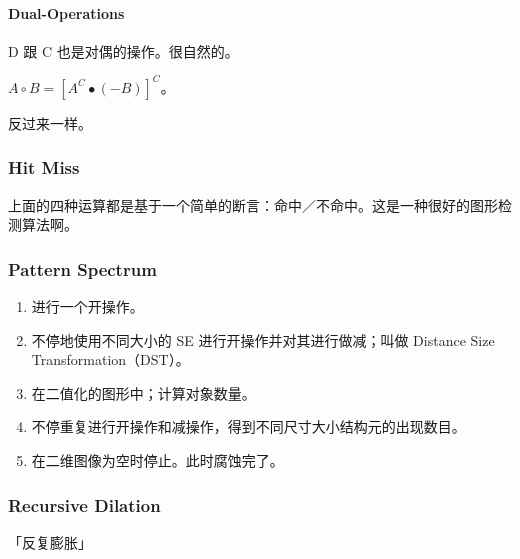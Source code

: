 \documentclass[
]{article}
\begin{document}
\hypertarget{header-n96}{%
\paragraph{Dual-Operations}\label{header-n96}}

D 跟 C 也是对偶的操作。很自然的。

\(A ∘ B = [A^C ∙ (- B)]^C\)。

反过来一样。

\hypertarget{header-n100}{%
\subsubsection{Hit \textbar{} Miss}\label{header-n100}}

上面的四种运算都是基于一个简单的断言：命中／不命中。这是一种很好的图形检测算法啊。

\hypertarget{header-n102}{%
\subsubsection{Pattern Spectrum}\label{header-n102}}

\begin{enumerate}
\def\labelenumi{\arabic{enumi}.}
\item
  进行一个开操作。
\item
  不停地使用不同大小的 SE 进行开操作并对其进行做减；叫做 Distance Size
  Transformation（DST）。
\item
  在二值化的图形中；计算对象数量。
\item
  不停重复进行开操作和减操作，得到不同尺寸大小结构元的出现数目。
\item
  在二维图像为空时停止。此时腐蚀完了。
\end{enumerate}

\hypertarget{header-n114}{%
\subsubsection{Recursive Dilation}\label{header-n114}}

「反复膨胀」
\end{document}
